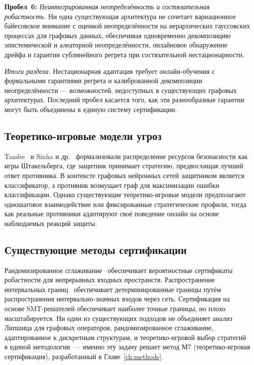 \medskip
\noindent\textbf{Пробел~6:} \emph{Неинтегрированная неопределённость и состязательная робастность.} Ни одна существующая архитектура не сочетает вариационное байесовское внимание с оценкой неопределённости на иерархических гауссовских процессах для графовых данных, обеспечивая одновременно декомпозицию эпистемической и алеаторной неопределённости, онлайновое обнаружение дрейфа и гарантии сублинейного регрета при состязательной нестационарности.

\medskip
\noindent\textit{Итоги раздела.} Нестационарная адаптация требует онлайн-обучения с формальными гарантиями регрета и калиброванной декомпозиции неопределённости --- возможностей, недоступных в существующих графовых архитектурах. Последний пробел касается того, как эти разнообразные гарантии могут быть объединены в единую систему сертификации.

\label{sec:certification}%

\subsection{Теоретико-игровые модели угроз}

Tambe~\cite{Tambe2011} и Sinha и др.~\cite{Sinha2018} формализовали распределение ресурсов безопасности как игры Штакельберга, где защитник принимает стратегию, предвосхищая лучший ответ противника. В контексте графовых нейронных сетей защитником является классификатор, а противник возмущает граф для максимизации ошибки классификации. Однако существующие теоретико-игровые модели предполагают одношаговое взаимодействие или фиксированные стратегические профили, тогда как реальные противники адаптируют своё поведение онлайн на основе наблюдаемых реакций защиты.

\subsection{Существующие методы сертификации}

Рандомизированное сглаживание~\cite{Cohen2019,Salman2019} обеспечивает вероятностные сертификаты робастности для непрерывных входных пространств. Распространение интервальных границ~\cite{Gowal2019,Wong2018} обеспечивает детерминированные границы путём распространения интервально-значных входов через сеть. Сертификация на основе SMT-решателей обеспечивает наиболее точные границы, но плохо масштабируется. Ни один из существующих подходов не объединяет анализ Липшица для графовых операторов, рандомизированное сглаживание, адаптированное к дискретным структурам, и теоретико-игровой выбор стратегий в единой методологии~--- именно эту задачу решает метод М7 (теоретико-игровая сертификация), разработанный в Главе~\ref{ch:methods}.

